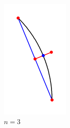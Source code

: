 \documentclass{gshs_thesis}
\theoremstyle{theorem}
\theoremstyle{lemma}
\theoremstyle{definition}
\begin{document}
\begin{figure}[h]
\begin{center}
\begin{subfigure}{.2\textwidth}
	    	\includegraphics[width=\textwidth]{image/BCstep3}
	        \caption{$n=3$}
    	\end{subfigure}
	    \begin{subfigure}{.2\textwidth}

\end{subfigure}
\end{center}
\end{figure}
\end{document}
